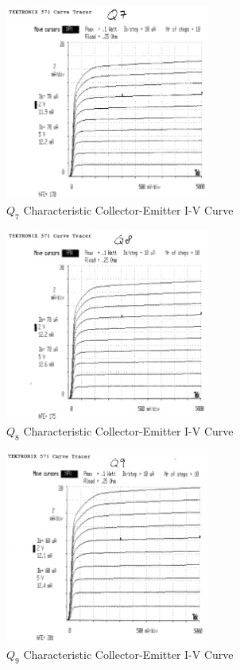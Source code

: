 \documentclass[titlepage, letterpaper, 10.5pt]{article}
\begin{document}
\begin{figure}[ht]
	\centering
	\includegraphics[width=0.6\textwidth]{results/q7-characteristics}
	\caption{$Q_{7}$ Characteristic Collector-Emitter I-V Curve}
\end{figure}

\begin{figure}[ht]
	\centering
	\includegraphics[width=0.6\textwidth]{results/q8-characteristics}
	\caption{$Q_{8}$ Characteristic Collector-Emitter I-V Curve}
\end{figure}

\begin{figure}[ht]
	\centering
	\includegraphics[width=0.6\textwidth]{results/q9-characteristics}
	\caption{$Q_{9}$ Characteristic Collector-Emitter I-V Curve}
\end{figure}
\end{document}
